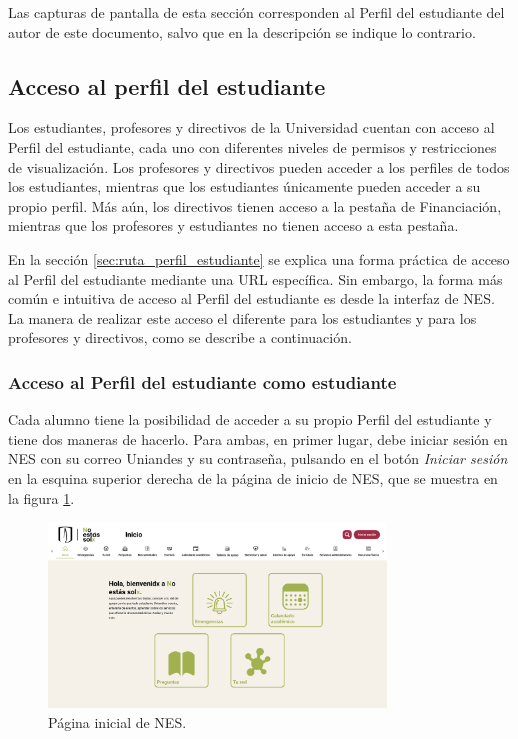 Las capturas de pantalla de esta sección corresponden al Perfil del estudiante del autor de este documento, salvo que en la descripción se indique lo contrario.

\subsection{Acceso al perfil del estudiante}

Los estudiantes, profesores y directivos de la Universidad cuentan con acceso al Perfil del estudiante, cada uno con diferentes niveles de permisos y restricciones de visualización. Los profesores y directivos pueden acceder a los perfiles de todos los estudiantes, mientras que los estudiantes únicamente pueden acceder a su propio perfil. Más aún, los directivos tienen acceso a la pestaña de Financiación, mientras que los profesores y estudiantes no tienen acceso a esta pestaña.

En la sección \ref{sec:ruta_perfil_estudiante} se explica una forma práctica de acceso al Perfil del estudiante mediante una URL específica. Sin embargo, la forma más común e intuitiva de acceso al Perfil del estudiante es desde la interfaz de \gls{NES}. La manera de realizar este acceso el diferente para los estudiantes y para los profesores y directivos, como se describe a continuación.

\subsubsection{Acceso al Perfil del estudiante como estudiante}

Cada alumno tiene la posibilidad de acceder a su propio Perfil del estudiante y tiene dos maneras de hacerlo. Para ambas, en primer lugar, debe iniciar sesión en \gls{NES} con su correo Uniandes y su contraseña, pulsando en el botón \textit{Iniciar sesión} en la esquina superior derecha de la página de inicio de \gls{NES}, que se muestra en la figura \ref{fig:landing}.

\begin{figure}[H]
  \centering
  \includegraphics[width=0.8\textwidth]{img/nes/landing.png}
  \caption{Página inicial de NES.}
  \label{fig:landing}
\end{figure}

